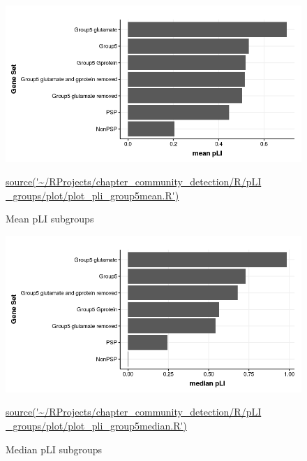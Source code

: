 \begin{figure}
    \centering
    \includegraphics[width=\textwidth]{images/chapter_community_detection/ggplot2/pLI_group5_glutamate/Rplot_meanPLI.png}
    \caption{Mean pLI subgroups}
    \tiny\url{source('~/RProjects/chapter_community_detection/R/pLI _groups/plot/plot_pli_group5mean.R')}
    \label{fig:barplot pli mean subgroups group5}
\end{figure}

\begin{figure}
    \centering
    \includegraphics[width=\textwidth]{images/chapter_community_detection/ggplot2/pLI_group5_glutamate/Rplot_median_pLI.png}
    \caption{Median pLI subgroups}
    \tiny\url{source('~/RProjects/chapter_community_detection/R/pLI _groups/plot/plot_pli_group5median.R')}
    \label{fig:barplot pli median subgroups group5}
\end{figure}

